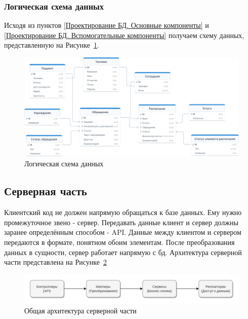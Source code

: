 \documentclass[a4paper,article]{article}
\begin{document}
    \subsubsection{Логическая схема данных}

    Исходя из пунктов \ref{Проектирование БД. Основные компоненты} и \ref{Проектирование БД. Вспомогательные компоненты} получаем схему данных, представленную на Рисунке~\ref{fig:Логическая схема данных}.

    \begin{figure}[h]

        \centering

        \includegraphics[width=0.9\linewidth]{Логическая схема данных.png}

        \caption{\centering Логическая схема данных}

        \label{fig:Логическая схема данных}

    \end{figure}

    \newpage

    \subsection{Серверная часть}

    Клиентский код не должен напрямую обращаться к базе данных. Ему нужно промежуточное звено - сервер. Передавать данные клиент и сервер должны заранее определённым способом - API. Данные между клиентом и сервером передаются в формате, понятном обоим элементам. После преобразования данных в сущности, сервер работает напрямую с бд. Архитектура серверной части представлена на Рисунке~\ref{fig:Архитектура серверной части}

    \begin{figure}[h]

        \centering

        \includegraphics[width=0.9\linewidth]{Архитектура серверной части.png}

        \caption{\centering Общая архитектура серверной части}

        \label{fig:Архитектура серверной части}

    \end{figure}
\end{document}
